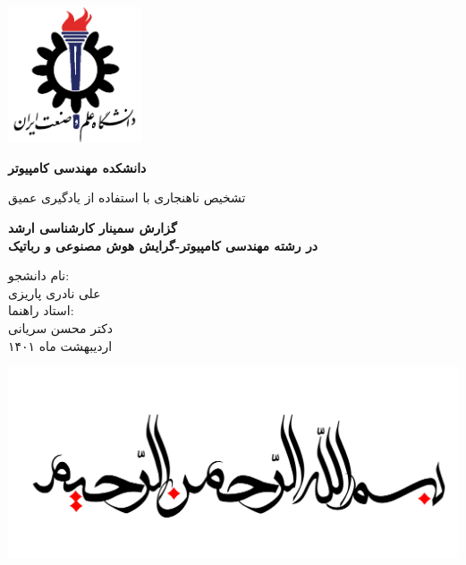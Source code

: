 \documentclass[12pt,a4paper]{report}
\theoremstyle{definition}
\theoremstyle{definition}
\begin{document}
	\thispagestyle{empty}
	\vspace*{25mm}
	\centerline{\includegraphics[height=4cm]{./images/logos/iust.png}}

	\begin{center}
	\textbf{
		دانشکده مهندسی کامپیوتر
	}
	\\[1cm]
	\baselineskip=2cm
	{\titr
	\begin{Huge}
	تشخیص ناهنجاری با استفاده از یادگیری عمیق\\[1cm]
	\end{Huge}}
	{\Large 
		\textbf{
			گزارش سمینار کارشناسی ارشد\\
			در رشته مهندسی کامپیوتر-گرایش هوش مصنوعی و رباتیک
		} \\[1cm]
	}

	{\Large { 
	نام دانشجو:
	}
	\\
	{\Large  علی نادری پاریزی }
	\\[.5cm]
	{\Large  
		استاد راهنما:
	}
	\\
	{\Large دکتر محسن سریانی}
	\\[.6cm]
	}
	اردیبهشت ماه ۱۴۰۱
	\end{center}

	\newpage
		\begin{center}
		\includegraphics[width=\linewidth]{./images/logos/in-the-name-of-god.jpg}
		\end{center}
	\newpage
	
	
\end{document}

